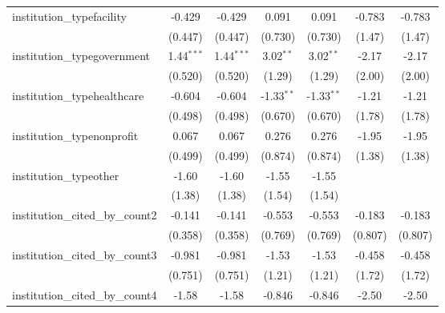 \begin{tabular}{lcccccc}
   institution\_typefacility             & -0.429        & -0.429        & 0.091         & 0.091         & -0.783        & -0.783\\   
                                         & (0.447)       & (0.447)       & (0.730)       & (0.730)       & (1.47)        & (1.47)\\   
   institution\_typegovernment           & 1.44$^{***}$  & 1.44$^{***}$  & 3.02$^{**}$   & 3.02$^{**}$   & -2.17         & -2.17\\   
                                         & (0.520)       & (0.520)       & (1.29)        & (1.29)        & (2.00)        & (2.00)\\   
   institution\_typehealthcare           & -0.604        & -0.604        & -1.33$^{**}$  & -1.33$^{**}$  & -1.21         & -1.21\\   
                                         & (0.498)       & (0.498)       & (0.670)       & (0.670)       & (1.78)        & (1.78)\\   
   institution\_typenonprofit            & 0.067         & 0.067         & 0.276         & 0.276         & -1.95         & -1.95\\   
                                         & (0.499)       & (0.499)       & (0.874)       & (0.874)       & (1.38)        & (1.38)\\   
   institution\_typeother                & -1.60         & -1.60         & -1.55         & -1.55         &               &   \\   
                                         & (1.38)        & (1.38)        & (1.54)        & (1.54)        &               &   \\   
   institution\_cited\_by\_count2        & -0.141        & -0.141        & -0.553        & -0.553        & -0.183        & -0.183\\   
                                         & (0.358)       & (0.358)       & (0.769)       & (0.769)       & (0.807)       & (0.807)\\   
   institution\_cited\_by\_count3        & -0.981        & -0.981        & -1.53         & -1.53         & -0.458        & -0.458\\   
                                         & (0.751)       & (0.751)       & (1.21)        & (1.21)        & (1.72)        & (1.72)\\   
   institution\_cited\_by\_count4        & -1.58         & -1.58         & -0.846        & -0.846        & -2.50         & -2.50\\   

\end{tabular}
